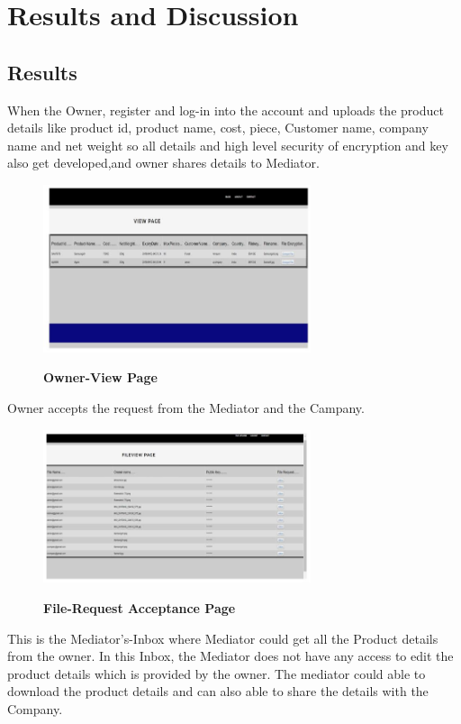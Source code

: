 \documentclass[BTech]{srmuthesis}
\begin{document}
\chapter{Results and Discussion}
\section{Results}
When the Owner, register and log-in into the account and uploads the product details like product id, product name, cost, piece, Customer name, company name and  net weight so all details and high level security of encryption and key also get developed,and owner shares details to Mediator. 
\begin{figure}[H]
\centering
\includegraphics[width=0.7\textwidth]{Ownerviewpage.jpg}
\label{Figure:10} \hspace{10mm}
\caption{\textbf{Owner-View Page}}
\end{figure}
Owner accepts the request from the Mediator and the Campany.
\begin{figure}[H]
\centering
\includegraphics[width=0.7\textwidth]{filerequestacceptpage.jpg}
\label{Figure:10} \hspace{10mm}
\caption{\textbf{File-Request Acceptance Page}}
\end{figure}
This is the Mediator's-Inbox where Mediator could get all the  Product details from the owner. In this Inbox, the Mediator does not have any access to edit the product details which is provided by the owner. The mediator could able to download the product details and can also able to share the details with the Company.
\end{document}
